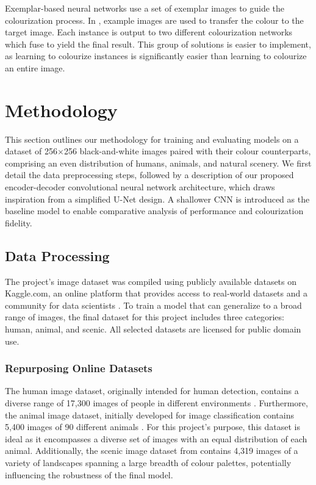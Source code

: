 \documentclass{article} %
\begin{document}
Exemplar-based neural networks use a set of exemplar images to guide the colourization process. In \citet{su2020instanceawareimagecolorization}, example images are
used to transfer the colour to the target image. Each instance is output to two different colourization networks which fuse to yield the final result. This group of 
solutions is easier to implement, as learning to colourize instances is significantly easier than learning to colourize an entire image. 

\section{Methodology}
\label{methodology}

This section outlines our methodology for training and evaluating models on a dataset of 256×256 black-and-white images paired with their colour counterparts, 
comprising an even distribution of humans, animals, and natural scenery. We first detail the data preprocessing steps, followed by a description of our proposed 
encoder-decoder convolutional neural network architecture, which draws inspiration from a simplified U-Net design. A shallower CNN is introduced as the baseline model 
to enable comparative analysis of performance and colourization fidelity.

\subsection{Data Processing}

 The project's image dataset was compiled using publicly available datasets on Kaggle.com, an online platform that provides access to real-world datasets and a community for data scientists \citep[]{kaggle}. To train a model that can generalize to a broad range of images, the final dataset for this project includes three categories: human, animal, and scenic. All selected datasets are licensed for public domain use. 

 \subsubsection{Repurposing Online Datasets}

The human image dataset, originally intended for human detection, contains a diverse range of 17,300 images of people in different environments \citep[]{kaggle_human}. Furthermore, the animal image dataset, initially developed for image classification contains 5,400 images of 90 different animals \citep[]{kaggle_animal}. For this project’s purpose, this dataset is ideal as it encompasses a diverse set of images with an equal distribution of each animal. Additionally, the scenic image dataset from \citet{kaggle_scene} contains 4,319 images of a variety of landscapes spanning a large breadth of colour palettes, potentially influencing the robustness of the final model.
\end{document}
